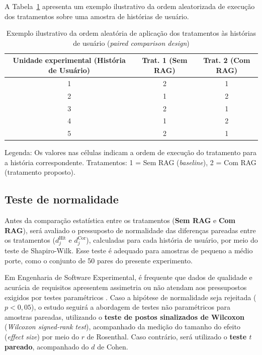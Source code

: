 A Tabela~\ref{tab:pareado-exemplo} apresenta um exemplo ilustrativo da ordem aleatorizada de execução dos tratamentos sobre uma amostra de histórias de usuário.

\begin{table}[H]
\centering
\caption{Exemplo ilustrativo da ordem aleatória de aplicação dos tratamentos às histórias de usuário (\textit{paired comparison design})}
\label{tab:pareado-exemplo}
\begin{tabular}{c|c|c}
\hline
\textbf{Unidade experimental (História de Usuário)} & \textbf{Trat. 1 (Sem RAG)} & \textbf{Trat. 2 (Com RAG)} \\
\hline
1 & 2 & 1 \\
2 & 1 & 2 \\
3 & 2 & 1 \\
4 & 1 & 2 \\
5 & 2 & 1 \\
\hline
\end{tabular}

\vspace{0.3em}
\small{Legenda: Os valores nas células indicam a ordem de execução do tratamento para a história correspondente. Tratamentos: 1 = Sem RAG (\textit{baseline}), 2 = Com RAG (tratamento proposto).}
\end{table}

\subsection{Teste de normalidade}

Antes da comparação estatística entre os tratamentos (\textbf{Sem RAG} e \textbf{Com RAG}), será avaliado o pressuposto de normalidade das diferenças pareadas entre os tratamentos ($d_j^{\mathrm{Hit}}$ e $d_j^{\mathrm{Cor}}$), calculadas para cada história de usuário, por meio do teste de Shapiro-Wilk. Esse teste é adequado para amostras de pequeno a médio porte, como o conjunto de 50 pares do presente experimento. %

Em Engenharia de Software Experimental, é frequente que dados de qualidade e acurácia de requisitos apresentem assimetria ou não atendam aos pressupostos exigidos por testes paramétricos \cite{wohlin2000}. Caso a hipótese de normalidade seja rejeitada ($p < 0{,}05$), o estudo seguirá a abordagem de testes não paramétricos para amostras pareadas, utilizando o \textbf{teste de postos sinalizados de Wilcoxon} (\textit{Wilcoxon signed-rank test}), acompanhado da medição do tamanho do efeito (\textit{effect size}) por meio do $r$ de Rosenthal. Caso contrário, será utilizado o \textbf{teste $t$ pareado}, acompanhado do $d$ de Cohen.

